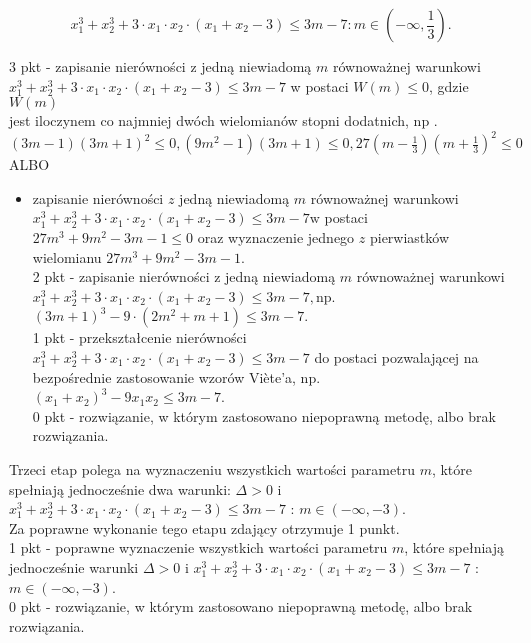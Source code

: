 \documentclass[10pt]{article}
\begin{document}
$$
x_{1}^{3}+x_{2}^{3}+3 \cdot x_{1} \cdot x_{2} \cdot\left(x_{1}+x_{2}-3\right) \leq 3 m-7: m \in\left(-\infty, \frac{1}{3}\right) .
$$

3 pkt - zapisanie nierówności z jedną niewiadomą $m$ równoważnej warunkowi\\
$x_{1}^{3}+x_{2}^{3}+3 \cdot x_{1} \cdot x_{2} \cdot\left(x_{1}+x_{2}-3\right) \leq 3 m-7$ w postaci $W(m) \leq 0$, gdzie $W(m)$\\
jest iloczynem co najmniej dwóch wielomianów stopni dodatnich, np .\\
$(3 m-1)(3 m+1)^{2} \leq 0,\left(9 m^{2}-1\right)(3 m+1) \leq 0,27\left(m-\frac{1}{3}\right)\left(m+\frac{1}{3}\right)^{2} \leq 0$\\
ALBO

\begin{itemize}
  \item zapisanie nierówności $z$ jedną niewiadomą $m$ równoważnej warunkowi $x_{1}^{3}+x_{2}^{3}+3 \cdot x_{1} \cdot x_{2} \cdot\left(x_{1}+x_{2}-3\right) \leq 3 m-7 \mathrm{w}$ postaci\\
$27 m^{3}+9 m^{2}-3 m-1 \leq 0$ oraz wyznaczenie jednego $z$ pierwiastków wielomianu $27 m^{3}+9 m^{2}-3 m-1$.\\
2 pkt - zapisanie nierówności z jedną niewiadomą $m$ równoważnej warunkowi\\
$x_{1}^{3}+x_{2}^{3}+3 \cdot x_{1} \cdot x_{2} \cdot\left(x_{1}+x_{2}-3\right) \leq 3 m-7, \mathrm{np}$.\\
$(3 m+1)^{3}-9 \cdot\left(2 m^{2}+m+1\right) \leq 3 m-7$.\\
1 pkt - przekształcenie nierówności $x_{1}^{3}+x_{2}^{3}+3 \cdot x_{1} \cdot x_{2} \cdot\left(x_{1}+x_{2}-3\right) \leq 3 m-7$ do postaci pozwalającej na bezpośrednie zastosowanie wzorów Viète'a, np.\\
$\left(x_{1}+x_{2}\right)^{3}-9 x_{1} x_{2} \leq 3 m-7$.\\
0 pkt - rozwiązanie, w którym zastosowano niepoprawną metodę, albo brak rozwiązania.
\end{itemize}

Trzeci etap polega na wyznaczeniu wszystkich wartości parametru $m$, które spełniają jednocześnie dwa warunki: $\Delta>0$ i $x_{1}^{3}+x_{2}^{3}+3 \cdot x_{1} \cdot x_{2} \cdot\left(x_{1}+x_{2}-3\right) \leq 3 m-7$ : $m \in(-\infty,-3)$.\\
Za poprawne wykonanie tego etapu zdający otrzymuje 1 punkt.\\
1 pkt - poprawne wyznaczenie wszystkich wartości parametru $m$, które spełniają\\
jednocześnie warunki $\Delta>0$ i $x_{1}^{3}+x_{2}^{3}+3 \cdot x_{1} \cdot x_{2} \cdot\left(x_{1}+x_{2}-3\right) \leq 3 m-7$ : $m \in(-\infty,-3)$.\\
0 pkt - rozwiązanie, w którym zastosowano niepoprawną metodę, albo brak rozwiązania.
\end{document}
